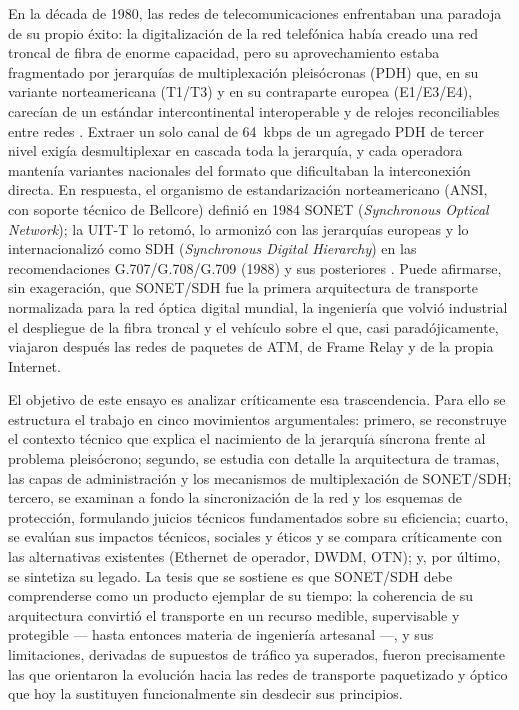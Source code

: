 \documentclass[12pt,a4paper]{article}
\begin{document}
En la década de 1980, las redes de telecomunicaciones enfrentaban una paradoja de su propio éxito: la digitalización de la red telefónica había creado una red troncal de fibra de enorme capacidad, pero su aprovechamiento estaba fragmentado por jerarquías de multiplexación pleisócronas (PDH) que, en su variante norteamericana (T1/T3) y en su contraparte europea (E1/E3/E4), carecían de un estándar intercontinental interoperable y de relojes reconciliables entre redes \cite{stallings2004, tanenbaum2012}. Extraer un solo canal de 64~kbps de un agregado PDH de tercer nivel exigía desmultiplexar en cascada toda la jerarquía, y cada operadora mantenía variantes nacionales del formato que dificultaban la interconexión directa. En respuesta, el organismo de estandarización norteamericano (ANSI, con soporte técnico de Bellcore) definió en 1984 SONET (\emph{Synchronous Optical Network}); la UIT-T lo retomó, lo armonizó con las jerarquías europeas y lo internacionalizó como SDH (\emph{Synchronous Digital Hierarchy}) en las recomendaciones G.707/G.708/G.709 (1988) y sus posteriores \cite{itug707, stallings2004}. Puede afirmarse, sin exageración, que SONET/SDH fue la primera arquitectura de transporte normalizada para la red óptica digital mundial, la ingeniería que volvió industrial el despliegue de la fibra troncal y el vehículo sobre el que, casi paradójicamente, viajaron después las redes de paquetes de ATM, de Frame Relay y de la propia Internet.

El objetivo de este ensayo es analizar críticamente esa trascendencia. Para ello se estructura el trabajo en cinco movimientos argumentales: primero, se reconstruye el contexto técnico que explica el nacimiento de la jerarquía síncrona frente al problema pleisócrono; segundo, se estudia con detalle la arquitectura de tramas, las capas de administración y los mecanismos de multiplexación de SONET/SDH; tercero, se examinan a fondo la sincronización de la red y los esquemas de protección, formulando juicios técnicos fundamentados sobre su eficiencia; cuarto, se evalúan sus impactos técnicos, sociales y éticos y se compara críticamente con las alternativas existentes (Ethernet de operador, DWDM, OTN); y, por último, se sintetiza su legado. La tesis que se sostiene es que SONET/SDH debe comprenderse como un producto ejemplar de su tiempo: la coherencia de su arquitectura convirtió el transporte en un recurso medible, supervisable y protegible --- hasta entonces materia de ingeniería artesanal ---, y sus limitaciones, derivadas de supuestos de tráfico ya superados, fueron precisamente las que orientaron la evolución hacia las redes de transporte paquetizado y óptico que hoy la sustituyen funcionalmente sin desdecir sus principios.
\end{document}
